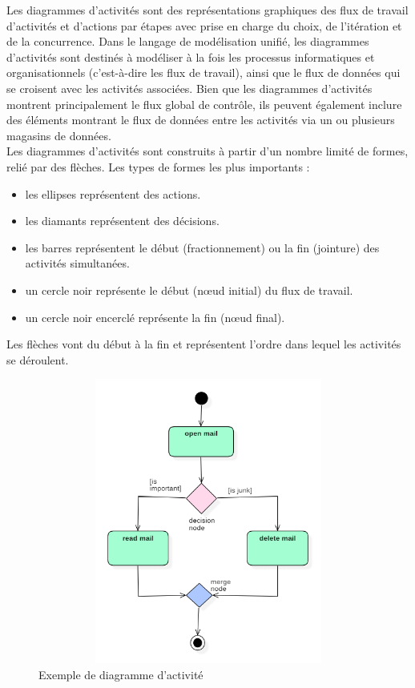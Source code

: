 \documentclass[12pt]{report}
\begin{document}
Les diagrammes d'activités sont des représentations graphiques des flux de travail d'activités et d'actions
par étapes avec prise en charge du choix, de l'itération et de la concurrence.
Dans le langage de modélisation unifié, les diagrammes d'activités sont destinés à modéliser
à la fois les processus informatiques et organisationnels (c'est-à-dire les flux de travail),
ainsi que le flux de données qui se croisent avec les activités associées. Bien que les
diagrammes d'activités montrent principalement le flux global de contrôle, ils peuvent
également inclure des éléments montrant le flux de données entre les activités via un ou
plusieurs magasins de données.
\\
Les diagrammes d'activités sont construits à partir d'un nombre limité de formes, relié par des flèches. Les types de formes les plus importants :
\begin{itemize}
    \item les ellipses représentent des actions.
    \item les diamants représentent des décisions.
    \item les barres représentent le début (fractionnement) ou la fin (jointure) des activités simultanées.
    \item un cercle noir représente le début (nœud initial) du flux de travail.
    \item un cercle noir encerclé représente la fin (nœud final).
\end{itemize}
Les flèches vont du début à la fin et représentent l'ordre dans lequel les activités se déroulent.

\begin{figure}[h]
\centering
    \centerline{\includegraphics[width = 4.5in, height = 3.7in]{../Images/DiagActEX.png}}
    \caption{Exemple de diagramme d'activité}
\end{figure}
\end{document}
